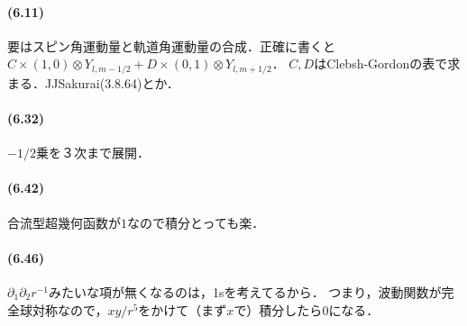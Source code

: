 \paragraph{(6.11)}
要はスピン角運動量と軌道角運動量の合成．正確に書くと$C\times(1, 0)\otimes Y_{l, m - 1/2} + D\times(0, 1)\otimes Y_{l, m + 1/2}$．
$C, D$はClebsh-Gordonの表で求まる．JJSakurai(3.8.64)とか．

\paragraph{(6.32)}
$ - 1/2$乗を３次まで展開．


\paragraph{(6.42)}
合流型超幾何函数が$1$なので積分とっても楽．

\paragraph{(6.46)}
$\partial_1\partial_2 r^{ - 1}$みたいな項が無くなるのは，1sを考えてるから．
つまり，波動関数が完全球対称なので，$xy/r^5$をかけて（まず$x$で）積分したら$0$になる．

